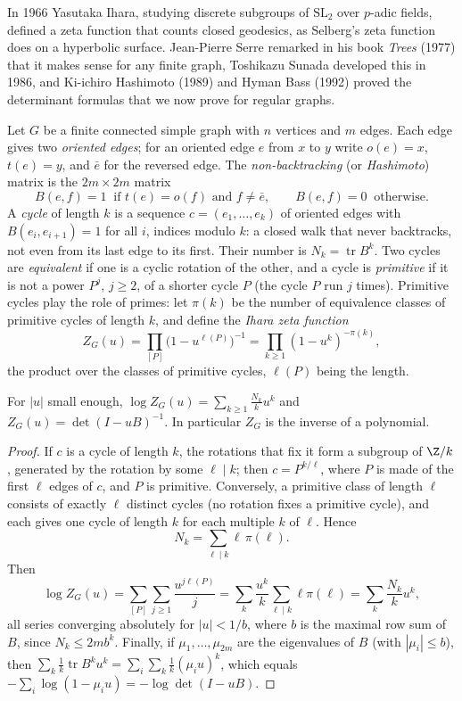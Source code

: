 In 1966 Yasutaka Ihara, studying discrete subgroups of $\mathrm{SL}_2$ over $p$-adic fields, defined a zeta function that counts closed geodesics, as Selberg's zeta function does on a hyperbolic surface. Jean-Pierre Serre
remarked in his book \emph{Trees} (1977) that it makes sense for any finite graph, Toshikazu Sunada developed this in 1986, and Ki-ichiro Hashimoto (1989) and Hyman Bass (1992) proved the determinant formulas
that we now prove for regular graphs.

Let $G$ be a finite connected simple graph with $n$ vertices and $m$ edges. Each edge gives two \emph{oriented edges}; for an oriented edge $e$ from $x$ to $y$ write $o(e)=x$, $t(e)=y$, and $\bar e$ for the reversed edge.
The \emph{non-backtracking} (or \emph{Hashimoto}) matrix is the $2m\times2m$ matrix
\[
B(e,f)=1\ \text{ if }t(e)=o(f)\text{ and }f\ne\bar e,\qquad B(e,f)=0\ \text{ otherwise.}
\]
A \emph{cycle} of length $k$ is a sequence $c=(e_1,\dots,e_k)$ of oriented edges with $B(e_i,e_{i+1})=1$ for all $i$, indices modulo $k$: a closed walk that never backtracks, not even from its last edge to its first.
Their number is $N_k=\operatorname{tr}B^k$. Two cycles are \emph{equivalent} if one is a cyclic rotation of the other, and a cycle is \emph{primitive} if it is not a power $P^j$, $j\ge2$, of a shorter cycle $P$ (the
cycle $P$ run $j$ times). Primitive cycles play the role of primes: let $\pi(k)$ be the number of equivalence classes of primitive cycles of length $k$, and define the \emph{Ihara zeta function}
\[
Z_G(u)=\prod_{[P]}\bigl(1-u^{\ell(P)}\bigr)^{-1}=\prod_{k\ge1}(1-u^k)^{-\pi(k)},
\]
the product over the classes of primitive cycles, $\ell(P)$ being the length.

\begin{proposition}\label{prop:iharadet}
For $|u|$ small enough, $\displaystyle\log Z_G(u)=\sum_{k\ge1}\frac{N_k}ku^k$ and $Z_G(u)=\det(I-uB)^{-1}$. In particular $Z_G$ is the inverse of a polynomial.
\end{proposition}

\begin{proof}
If $c$ is a cycle of length $k$, the rotations that fix it form a subgroup of $\Z/k$, generated by the rotation by some $\ell\mid k$; then $c=P^{k/\ell}$, where $P$ is made of the first $\ell$ edges of $c$, and $P$ is primitive.
Conversely, a primitive class of length $\ell$ consists of exactly $\ell$ distinct cycles (no rotation fixes a primitive cycle), and each gives one cycle of length $k$ for each multiple $k$ of $\ell$. Hence
\begin{equation}\label{eq:nkpi}
N_k=\sum_{\ell\mid k}\ell\,\pi(\ell).
\end{equation}
Then
\[
\log Z_G(u)=\sum_{[P]}\sum_{j\ge1}\frac{u^{j\ell(P)}}j=\sum_k\frac{u^k}k\sum_{\ell\mid k}\ell\pi(\ell)=\sum_k\frac{N_k}ku^k ,
\]
all series converging absolutely for $|u|<1/b$, where $b$ is the maximal row sum of $B$, since
$N_k\le2mb^{k}$. Finally, if $\mu_1,\dots,\mu_{2m}$ are the eigenvalues of $B$ (with $|\mu_i|\le b$), then $\sum_k\frac1k\operatorname{tr}B^ku^k=\sum_i\sum_k\frac1k(\mu_iu)^k$, which equals $-\sum_i\log(1-\mu_iu)=-\log\det(I-uB)$.
\end{proof}

